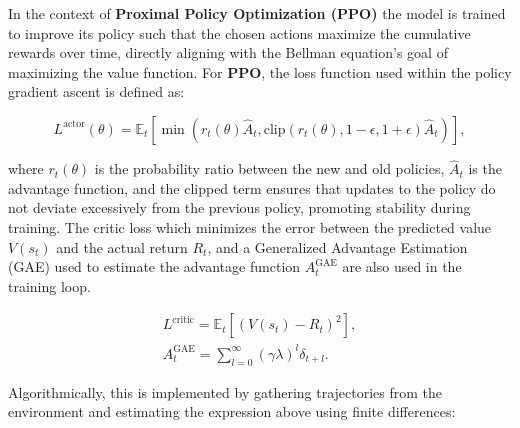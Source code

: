In the context of \textbf{Proximal Policy Optimization (PPO)}
the model is trained to improve its policy such that the chosen actions maximize the cumulative rewards over time,
directly aligning with the Bellman equation's goal of maximizing the value function.
For \textbf{PPO}, the loss function used within the policy gradient ascent is defined as:

\[
    L^{\text{actor}}(\theta) = \mathbb{E}_t \left[ \min \left( r_t(\theta) \hat{A}_t, \text{clip}(r_t(\theta), 1 - \epsilon, 1 + \epsilon) \hat{A}_t \right) \right],
\]

where \( r_t(\theta) \) is the probability ratio between the new and old policies, \( \hat{A}_t \) is the advantage function,
and the clipped term ensures that updates to the policy do not deviate excessively from the previous policy, promoting stability during training.
The critic loss which minimizes the error between the predicted value \( V(s_t) \) and the actual return \( R_t \),
and a Generalized Advantage Estimation (GAE) used to estimate the advantage function \( A^{\text{GAE}}_t \) are also used in the training loop.

\begin{gather*}
    L^{\text{critic}} = \mathbb{E}_t \left[ \left( V(s_t) - R_t \right)^2 \right],\\
    A^{\text{GAE}}_t = \sum_{l=0}^{\infty} (\gamma \lambda)^l \delta_{t+l}.
\end{gather*}

Algorithmically, this is implemented by gathering trajectories from the environment and estimating the expression above using finite differences:

